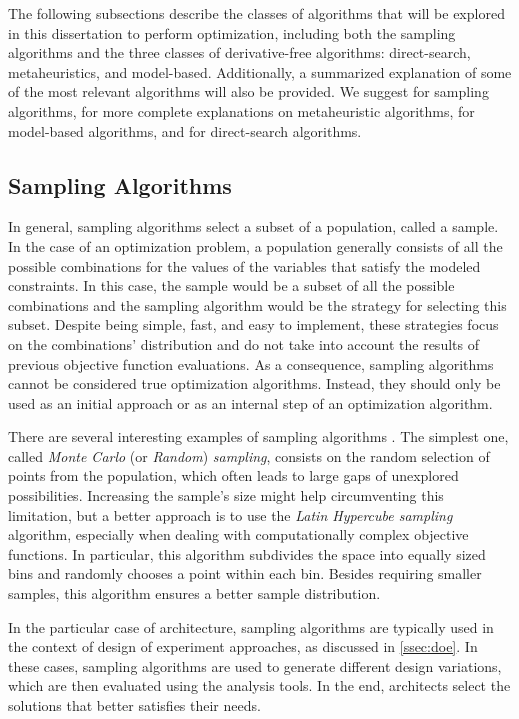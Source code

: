 	The following subsections describe the classes of algorithms that will be explored in this dissertation to perform optimization, including both the sampling algorithms and the three classes of derivative-free algorithms: direct-search, metaheuristics, and model-based. Additionally, a summarized explanation of some of the most relevant algorithms will also be provided. We suggest \cite{Tille2006} for sampling algorithms, \cite{BlumRoli2003Metaheuristics, Glover2003Metaheuristics, Zhou2011} for more complete explanations on metaheuristic algorithms, \cite{Koziel2011} for model-based algorithms, and \cite{Conn2009} for direct-search algorithms.
	
	\subsection{Sampling Algorithms}
	\label{ssec:sampling}
	In general, sampling algorithms select a subset of a population, called a sample. In the case of an optimization problem, a population generally consists of all the possible combinations for the values of the variables that satisfy the modeled constraints. In this case, the sample would be a subset of all the possible combinations and the sampling algorithm would be the strategy for selecting this subset. Despite being simple, fast, and easy to implement, these strategies focus on the combinations' distribution and do not take into account the results of previous objective function evaluations. As a consequence, sampling algorithms cannot be considered true optimization algorithms. Instead, they should only be used as an initial approach or as an internal step of an optimization algorithm.
	
	There are several interesting examples of sampling algorithms \cite{Tille2006}. The simplest one, called \textit{Monte Carlo} (or \textit{Random}) \textit{sampling}, consists on the random selection of points from the population, which often leads to large gaps of unexplored possibilities. Increasing the sample's size might help circumventing this limitation, but a better approach is to use the \textit{Latin Hypercube sampling} algorithm, especially when dealing with computationally complex objective functions. In particular, this algorithm subdivides the space into equally sized bins and randomly chooses a point within each bin. Besides requiring smaller samples, this algorithm ensures a better sample distribution.
	
	In the particular case of architecture, sampling algorithms are typically used in the context of design of experiment approaches, as discussed in \cref{ssec:doe}. In these cases, sampling algorithms are used to generate different design variations, which are then evaluated using the analysis tools. In the end, architects select the solutions that better satisfies their needs.
	
